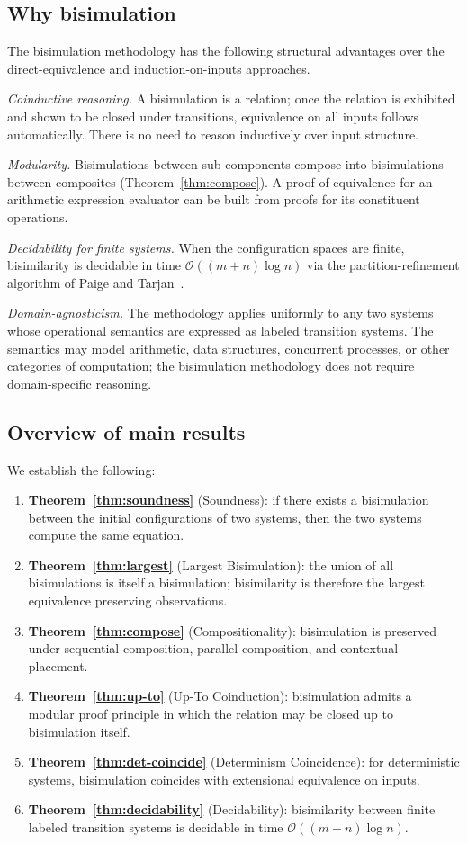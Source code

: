 \documentclass[twocolumn,11pt,a4paper]{article}
\begin{document}
\subsection{Why bisimulation}

The bisimulation methodology has the following structural advantages over the direct-equivalence and induction-on-inputs approaches.

\emph{Coinductive reasoning.} A bisimulation is a relation; once the relation is exhibited and shown to be closed under transitions, equivalence on all inputs follows automatically. There is no need to reason inductively over input structure.

\emph{Modularity.} Bisimulations between sub-components compose into bisimulations between composites (Theorem~\ref{thm:compose}). A proof of equivalence for an arithmetic expression evaluator can be built from proofs for its constituent operations.

\emph{Decidability for finite systems.} When the configuration spaces are finite, bisimilarity is decidable in time $\mathcal{O}((m + n) \log n)$ via the partition-refinement algorithm of Paige and Tarjan~\citep{paige1987three}.

\emph{Domain-agnosticism.} The methodology applies uniformly to any two systems whose operational semantics are expressed as labeled transition systems. The semantics may model arithmetic, data structures, concurrent processes, or other categories of computation; the bisimulation methodology does not require domain-specific reasoning.

\subsection{Overview of main results}

We establish the following:
\begin{enumerate}[nosep,leftmargin=*]
\item \textbf{Theorem~\ref{thm:soundness}} (Soundness): if there exists a bisimulation between the initial configurations of two systems, then the two systems compute the same equation.
\item \textbf{Theorem~\ref{thm:largest}} (Largest Bisimulation): the union of all bisimulations is itself a bisimulation; bisimilarity is therefore the largest equivalence preserving observations.
\item \textbf{Theorem~\ref{thm:compose}} (Compositionality): bisimulation is preserved under sequential composition, parallel composition, and contextual placement.
\item \textbf{Theorem~\ref{thm:up-to}} (Up-To Coinduction): bisimulation admits a modular proof principle in which the relation may be closed up to bisimulation itself.
\item \textbf{Theorem~\ref{thm:det-coincide}} (Determinism Coincidence): for deterministic systems, bisimulation coincides with extensional equivalence on inputs.
\item \textbf{Theorem~\ref{thm:decidability}} (Decidability): bisimilarity between finite labeled transition systems is decidable in time $\mathcal{O}((m + n) \log n)$.
\end{enumerate}
\end{document}
